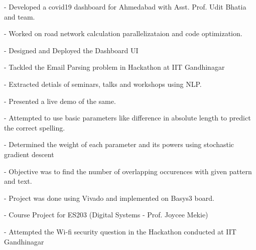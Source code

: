 
\begin{bulletlist}
	\item {}
	\begin{bulletlist}
		\item[-] Developed a covid19 dashboard for Ahmedabad with Asst. Prof. Udit Bhatia and team.
		\item[-] Worked on road network calculation parallelizataion and code optimization. 
		\item[-] Designed and Deployed the Dashboard UI
	\end{bulletlist}
	\item {}
	\begin{bulletlist}
		\item[-] Tackled the Email Parsing problem in Hackathon at IIT Gandhinagar
		\item[-] Extracted detials of seminars, talks and workshops using NLP.
		\item[-] Presented a live demo of the same.
	\end{bulletlist}
	\item {}
	\begin{bulletlist}
		\item[-] Attempted to use basic parameters like difference in absolute length to predict the correct spelling.
		\item[-] Determined the weight of each parameter and its powers using stochastic gradient descent
	\end{bulletlist}
	\item {}
	\begin{bulletlist}
		\item[-] Objective was to find the number of overlapping occurences with given pattern and text.
		\item[-] Project was done using Vivado and implemented on Basys3 board.
		\item[-] Course Project for ES203 (Digital Systems - Prof. Joycee Mekie)
	\end{bulletlist}
	\item {}
	\begin{bulletlist}
		\item[-] Attempted the Wi-fi security question in the Hackathon conducted at IIT Gandhinagar

\end{bulletlist}
\end{bulletlist}
